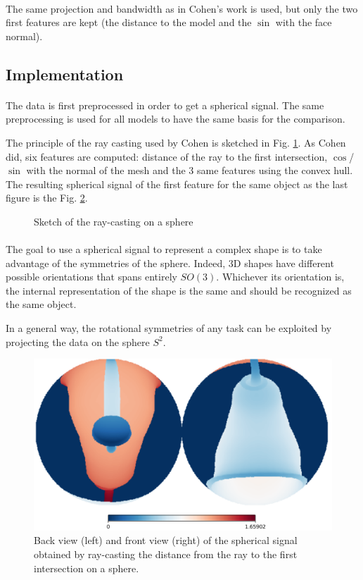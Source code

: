 \documentclass[11pt]{report}
\begin{document}
\paragraph*{}
The same projection and bandwidth as in Cohen's work is used, but only the two first features are kept (the distance to the model and the $\sin$ with the face normal).
\subsection{Implementation}
\paragraph*{}
The data is first preprocessed in order to get a spherical signal. The same preprocessing is used for all models to have the same basis for the comparison.

The principle of the ray casting used by Cohen is sketched in Fig. \ref{fig:ray_cast}. As Cohen did, six features are computed: distance of the ray to the first intersection, $\cos$/$\sin$ with the normal of the mesh and the 3 same features using the convex hull. The resulting spherical signal of the first feature for the same object as the last figure is the Fig. \ref{fig:sphere_signal}.
\begin{figure}[ht]
    \centering
    
    \caption{Sketch of the ray-casting on a sphere}
    \label{fig:ray_cast}
\end{figure}
\paragraph*{}
The goal to use a spherical signal to represent a complex shape is to take advantage of the symmetries of the sphere. Indeed, 3D shapes have different possible orientations that spans entirely $SO(3)$. Whichever its orientation is, the internal representation of the shape is the same and should be recognized as the same object.

In a general way, the rotational symmetries of any task can be exploited by projecting the data on the sphere $S^2$.

\begin{figure}[ht]
    \centering
    \includegraphics[width=0.5\linewidth]{lamp_sphere_000018.PNG}
    \caption{Back view (left) and front view (right) of the spherical signal obtained by ray-casting the distance from the ray to the first intersection on a sphere.}
    \label{fig:sphere_signal}
\end{figure}
\end{document}
